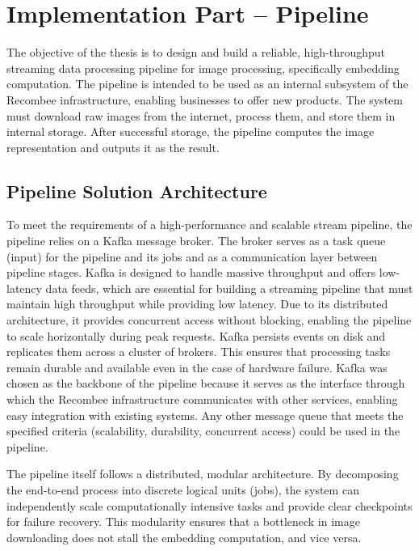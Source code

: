 \chapter{Implementation Part -- Pipeline}\label{ch:impl_pipeline}

The objective of the thesis is to design and build a reliable, high-throughput streaming data processing pipeline for image processing, specifically embedding computation. The pipeline is intended to be used as an internal subsystem of the Recombee infrastructure, enabling businesses to offer new products. The system must download raw images from the internet, process them, and store them in internal storage. After successful storage, the pipeline computes the image representation and outputs it as the result.

\section{Pipeline Solution Architecture}
To meet the requirements of a high-performance and scalable stream pipeline, the pipeline relies on a Kafka message broker. The broker serves as a task queue (input) for the pipeline and its jobs and as a communication layer between pipeline stages. Kafka is designed to handle massive throughput and offers low-latency data feeds, which are essential for building a streaming pipeline that must maintain high throughput while providing low latency. Due to its distributed architecture, it provides concurrent access without blocking, enabling the pipeline to scale horizontally during peak requests. Kafka persists events on disk and replicates them across a cluster of brokers. This ensures that processing tasks remain durable and available even in the case of hardware failure. Kafka was chosen as the backbone of the pipeline because it serves as the interface through which the Recombee infrastructure communicates with other services, enabling easy integration with existing systems. Any other message queue that meets the specified criteria (scalability, durability, concurrent access) could be used in the pipeline.  

The pipeline itself follows a distributed, modular architecture. By decomposing the end-to-end process into discrete logical units (jobs), the system can independently scale computationally intensive tasks and provide clear checkpoints for failure recovery. This modularity ensures that a bottleneck in image downloading does not stall the embedding computation, and vice versa.

